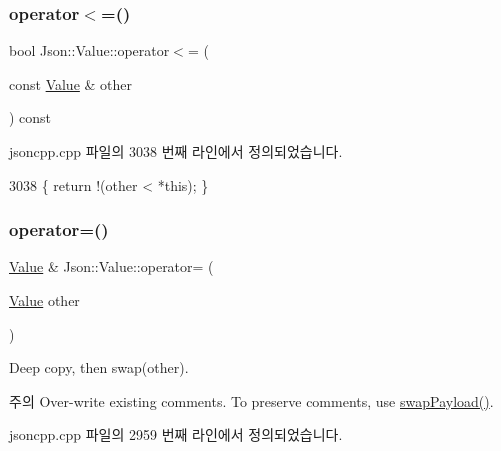 \subsubsection{\texorpdfstring{operator$<$=()}{operator<=()}}
{\footnotesize\ttfamily bool Json\+::\+Value\+::operator$<$= (\begin{DoxyParamCaption}\item[{const \hyperlink{class_json_1_1_value}{Value} \&}]{other }\end{DoxyParamCaption}) const}



jsoncpp.\+cpp 파일의 3038 번째 라인에서 정의되었습니다.


\begin{DoxyCode}
3038 \{ \textcolor{keywordflow}{return} !(other < *\textcolor{keyword}{this}); \}
\end{DoxyCode}
\mbox{\label{class_json_1_1_value_a795acb28772da4c5d85ae8f4af36c69f}} 
\subsubsection{\texorpdfstring{operator=()}{operator=()}}
{\footnotesize\ttfamily \hyperlink{class_json_1_1_value}{Value} \& Json\+::\+Value\+::operator= (\begin{DoxyParamCaption}\item[{\hyperlink{class_json_1_1_value}{Value}}]{other }\end{DoxyParamCaption})}

Deep copy, then swap(other). \begin{DoxyNote}{주의}
Over-\/write existing comments. To preserve comments, use \hyperlink{class_json_1_1_value_a5263476047f20e2fc6de470e4de34fe5}{swap\+Payload()}. 
\end{DoxyNote}


jsoncpp.\+cpp 파일의 2959 번째 라인에서 정의되었습니다.


